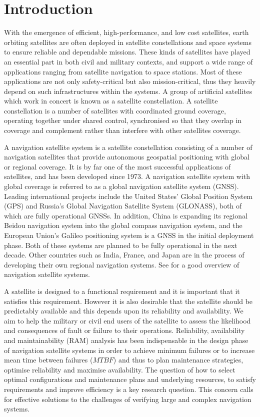 \documentclass[preprint,12pt]{qrei}
\begin{document}
\section{Introduction}

With the emergence of efficient, high-performance, and low cost satellites, earth orbiting satellites are often deployed in satellite constellations and space systems to ensure reliable and dependable missions. These kinds of satellites have played an essential part in both civil and military contexts, and support a wide range of applications ranging from satellite navigation to space stations. Most of these applications are not only safety-critical but also mission-critical, thus they heavily depend on such infrastructures within the systems. A group of artificial satellites which work in concert is known as a satellite constellation. A satellite constellation is a number of satellites with coordinated ground coverage, operating together under shared control, synchronised so that they overlap in coverage and complement rather than interfere with other satellites coverage.

A navigation satellite system is a satellite constellation consisting of a number of navigation satellites that provide autonomous geospatial positioning with global or regional coverage. It is by far one of the most successful applications of satellites, and has been developed since 1973. A navigation satellite system with global coverage is referred to as a global navigation satellite system (GNSS). Leading international projects include the United States' Global Position System (GPS) and Russia's Global Navigation Satellite System (GLONASS), both of which are fully operational GNSSs. In addition, China is expanding its regional Beidou navigation system into the global compass navigation system, and the European Union's Galileo positioning system is a GNSS in the initial deployment phase. Both of these systems are planned to be fully operational in the next decade. Other countries such as India, France, and Japan are in the process of developing their own regional navigation systems. See \cite{WLW07} for a good overview of navigation satellite systems.

A satellite is designed to a functional requirement and it is important that it satisfies this requirement. However it is also desirable that the satellite should be predictably available and this depends upon its reliability and availability. We aim to help the military or civil end users of the satellite to assess the likelihood and consequences of fault or failure to their operations. Reliability, availability and maintainability (RAM) analysis has been indispensable in the design phase of navigation satellite systems in order to achieve minimum failures or to increase mean time between failures ($MTBF$) and thus to plan maintenance strategies, optimise reliability and maximise availability. The question of how to select optimal configurations and maintenance plans and underlying resources, to satisfy requirements and improve efficiency is a key research question. This concern calls for effective solutions to the challenges of verifying large and complex navigation systems.
\end{document}
